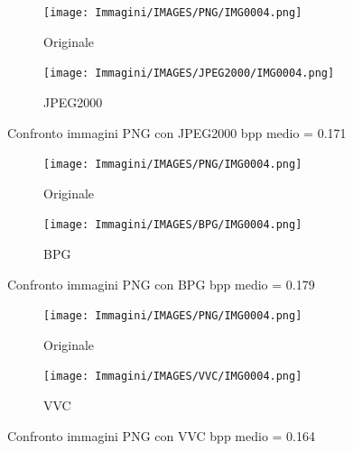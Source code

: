 \begin{figure}
    \centering
    \begin{subfigure}[t]{0.3\textwidth}
        \texttt{[image: Immagini/IMAGES/PNG/IMG0004.png]}
        \caption{Originale}
        \label{fig:OriginalJPEG2000}
    \end{subfigure}
    \hspace*{1.5cm}
    \begin{subfigure}[t]{0.3\textwidth}
        \texttt{[image: Immagini/IMAGES/JPEG2000/IMG0004.png]}
        \caption{JPEG2000}
        \label{fig:CompressedJPEG2000}
    \end{subfigure}
    \caption{Confronto immagini PNG con JPEG2000 bpp medio = 0.171}
    \label{fig:CompressionJPEG2000}
\end{figure}

\begin{figure}
    \centering
    \begin{subfigure}[t]{0.3\textwidth}
        \texttt{[image: Immagini/IMAGES/PNG/IMG0004.png]}
        \caption{Originale}
        \label{fig:OriginalBPG}
    \end{subfigure}
    \hspace*{1.5cm}
    \begin{subfigure}[t]{0.3\textwidth}
        \texttt{[image: Immagini/IMAGES/BPG/IMG0004.png]}
        \caption{BPG}
        \label{fig:CompressedBPG}
    \end{subfigure}
    \caption{Confronto immagini PNG con BPG bpp medio = 0.179}
    \label{fig:CompressionBPG}
\end{figure}

\begin{figure}
    \centering
    \begin{subfigure}[t]{0.3\textwidth}
        \texttt{[image: Immagini/IMAGES/PNG/IMG0004.png]}
        \caption{Originale}
        \label{fig:OriginalVVC}
    \end{subfigure}
    \hspace*{1.5cm}
    \begin{subfigure}[t]{0.3\textwidth}
        \texttt{[image: Immagini/IMAGES/VVC/IMG0004.png]}
        \caption{VVC}
        \label{fig:CompressedVVC}
    \end{subfigure}
    \caption{Confronto immagini PNG con VVC bpp medio = 0.164}
    \label{fig:CompressionVVC}
\end{figure}